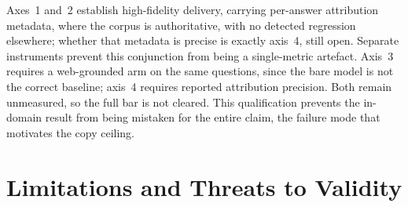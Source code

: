 \documentclass[10pt,twocolumn]{article}
\begin{document}
Axes~1 and~2 establish high-fidelity delivery, carrying per-answer attribution metadata, where the corpus is authoritative, with no detected regression elsewhere; whether that metadata is precise is exactly axis~4, still open. Separate instruments prevent this conjunction from being a single-metric artefact. Axis~3 requires a web-grounded arm on the same questions, since the bare model is not the correct baseline; axis~4 requires reported attribution precision. Both remain unmeasured, so the full bar is not cleared. This qualification prevents the in-domain result from being mistaken for the entire claim, the failure mode that motivates the copy ceiling.


\section{Limitations and Threats to Validity}\label{sec:limits}
\end{document}

